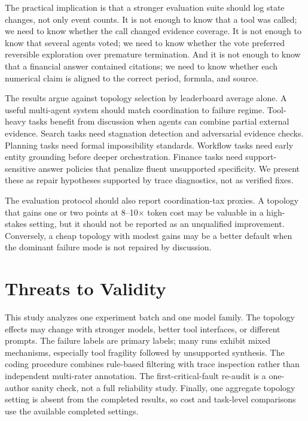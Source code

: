 \documentclass{article}
\theoremstyle{plain}
\theoremstyle{definition}
\theoremstyle{remark}
\begin{document}
The practical implication is that a stronger evaluation suite should log state changes, not only event counts. It is not enough to know that a tool was called; we need to know whether the call changed evidence coverage. It is not enough to know that several agents voted; we need to know whether the vote preferred reversible exploration over premature termination. And it is not enough to know that a financial answer contained citations; we need to know whether each numerical claim is aligned to the correct period, formula, and source.

The results argue against topology selection by leaderboard average alone. A useful multi-agent system should match coordination to failure regime. Tool-heavy tasks benefit from discussion when agents can combine partial external evidence. Search tasks need stagnation detection and adversarial evidence checks. Planning tasks need formal impossibility standards. Workflow tasks need early entity grounding before deeper orchestration. Finance tasks need support-sensitive answer policies that penalize fluent unsupported specificity. We present these as repair hypotheses supported by trace diagnostics, not as verified fixes.

The evaluation protocol should also report coordination-tax proxies. A topology that gains one or two points at 8--10$\times$ token cost may be valuable in a high-stakes setting, but it should not be reported as an unqualified improvement. Conversely, a cheap topology with modest gains may be a better default when the dominant failure mode is not repaired by discussion.

\section{Threats to Validity}
This study analyzes one experiment batch and one model family. The topology effects may change with stronger models, better tool interfaces, or different prompts. The failure labels are primary labels; many runs exhibit mixed mechanisms, especially tool fragility followed by unsupported synthesis. The coding procedure combines rule-based filtering with trace inspection rather than independent multi-rater annotation. The first-critical-fault re-audit is a one-author sanity check, not a full reliability study. Finally, one aggregate topology setting is absent from the completed results, so cost and task-level comparisons use the available completed settings.
\end{document}
